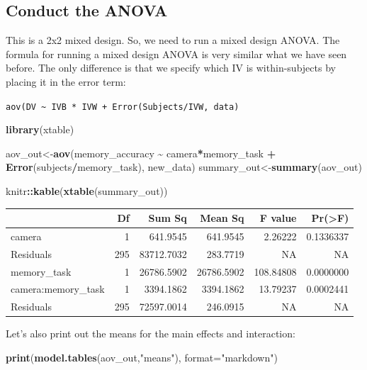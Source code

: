 \documentclass[
]{book}
\newenvironment{Shaded}{\begin{snugshade}}{\end{snugshade}}
\newcommand{\AttributeTok}[1]{\textcolor[rgb]{0.13,0.29,0.53}{#1}}
\newcommand{\FunctionTok}[1]{\textcolor[rgb]{0.13,0.29,0.53}{\textbf{#1}}}
\newcommand{\NormalTok}[1]{#1}
\newcommand{\OtherTok}[1]{\textcolor[rgb]{0.56,0.35,0.01}{#1}}
\newcommand{\SpecialCharTok}[1]{\textcolor[rgb]{0.81,0.36,0.00}{\textbf{#1}}}
\newcommand{\StringTok}[1]{\textcolor[rgb]{0.31,0.60,0.02}{#1}}
\begin{document}
\hypertarget{conduct-the-anova-2}{%
\subsection{Conduct the ANOVA}\label{conduct-the-anova-2}}

This is a 2x2 mixed design. So, we need to run a mixed design ANOVA. The formula for running a mixed design ANOVA is very similar what we have seen before. The only difference is that we specify which IV is within-subjects by placing it in the error term:

\texttt{aov(DV\ \textasciitilde{}\ IVB\ *\ IVW\ +\ Error(Subjects/IVW,\ data)}

\begin{Shaded}
\begin{Highlighting}[]
\FunctionTok{library}\NormalTok{(xtable)}

\NormalTok{aov\_out}\OtherTok{\textless{}{-}}\FunctionTok{aov}\NormalTok{(memory\_accuracy }\SpecialCharTok{\textasciitilde{}}\NormalTok{ camera}\SpecialCharTok{*}\NormalTok{memory\_task }\SpecialCharTok{+} \FunctionTok{Error}\NormalTok{(subjects}\SpecialCharTok{/}\NormalTok{memory\_task), new\_data)}
\NormalTok{summary\_out}\OtherTok{\textless{}{-}}\FunctionTok{summary}\NormalTok{(aov\_out)}

\NormalTok{knitr}\SpecialCharTok{::}\FunctionTok{kable}\NormalTok{(}\FunctionTok{xtable}\NormalTok{(summary\_out))}
\end{Highlighting}
\end{Shaded}

\begin{tabular}{l|r|r|r|r|r}
\hline
  & Df & Sum Sq & Mean Sq & F value & Pr(>F)\\
\hline
camera & 1 & 641.9545 & 641.9545 & 2.26222 & 0.1336337\\
\hline
Residuals & 295 & 83712.7032 & 283.7719 & NA & NA\\
\hline
memory\_task & 1 & 26786.5902 & 26786.5902 & 108.84808 & 0.0000000\\
\hline
camera:memory\_task & 1 & 3394.1862 & 3394.1862 & 13.79237 & 0.0002441\\
\hline
Residuals & 295 & 72597.0014 & 246.0915 & NA & NA\\
\hline
\end{tabular}

Let's also print out the means for the main effects and interaction:

\begin{Shaded}
\begin{Highlighting}[]
\FunctionTok{print}\NormalTok{(}\FunctionTok{model.tables}\NormalTok{(aov\_out,}\StringTok{"means"}\NormalTok{), }\AttributeTok{format=}\StringTok{"markdown"}\NormalTok{)}
\end{Highlighting}
\end{Shaded}
\end{document}
